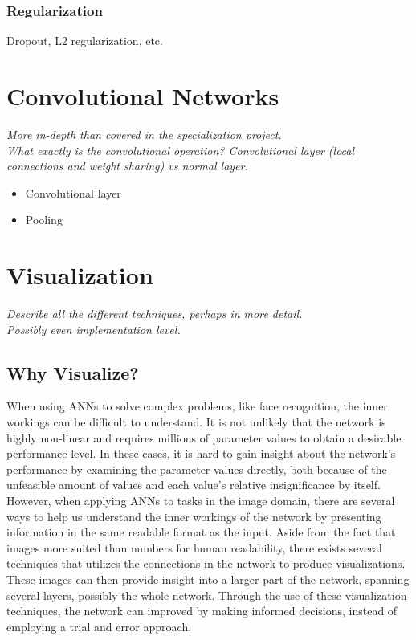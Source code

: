 \subsubsection{Regularization}

Dropout, L2 regularization, etc.

\section{Convolutional Networks}

\textit{More in-depth than covered in the specialization project. \\
What exactly is the convolutional operation? Convolutional layer (local connections and weight sharing) vs normal layer.}

\begin{itemize}
    \item Convolutional layer
    \item Pooling
\end{itemize}

\section{Visualization}
\textit{Describe all the different techniques, perhaps in more detail. \\
Possibly even implementation level.}

\subsection{Why Visualize?}

When using ANNs to solve complex problems, like face recognition, the inner workings can be difficult to understand. It is not unlikely that the network is highly non-linear and requires millions of parameter values to obtain a desirable performance level. In these cases, it is hard to gain insight about the network's performance by examining the parameter values directly, both because of the unfeasible amount of values and each value's relative insignificance by itself. However, when applying ANNs to tasks in the image domain, there are several ways to help us understand the inner workings of the network by presenting information in the same readable format as the input. Aside from the fact that images more suited than numbers for human readability, there exists several techniques that utilizes the connections in the network to produce visualizations. These images can then provide insight into a larger part of the network, spanning several layers, possibly the whole network. Through the use of these visualization techniques, the network can improved by making informed decisions, instead of employing a trial and error approach.


